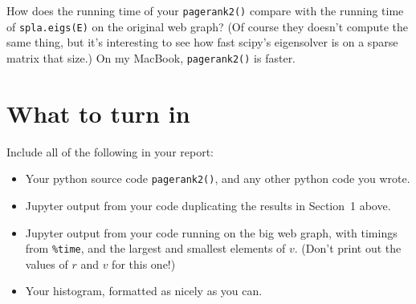 \documentclass[11pt]{article}
\begin{document}
How does the running time of your {\tt pagerank2()} compare with the
running time of {\tt spla.eigs(E)} on the original web graph?
(Of course they doesn't compute the same thing, but it's interesting
to see how fast scipy's eigensolver is on a sparse matrix that size.)
On my MacBook, {\tt pagerank2()} is faster.

\section{What to turn in}

Include all of the following in your report:
\begin{itemize}
\item 
Your python source code {\tt pagerank2()}, 
and any other python code you wrote.
\item 
Jupyter output from your code duplicating the results in Section~1 above.
\item 
Jupyter output from your code running on the big web graph,
with timings from {\tt \%time}, and the largest and smallest
elements of $v$.
(Don't print out the values of $r$ and $v$ for this one!)
\item 
Your histogram, formatted as nicely as you can.
\end{itemize}
\end{document}
